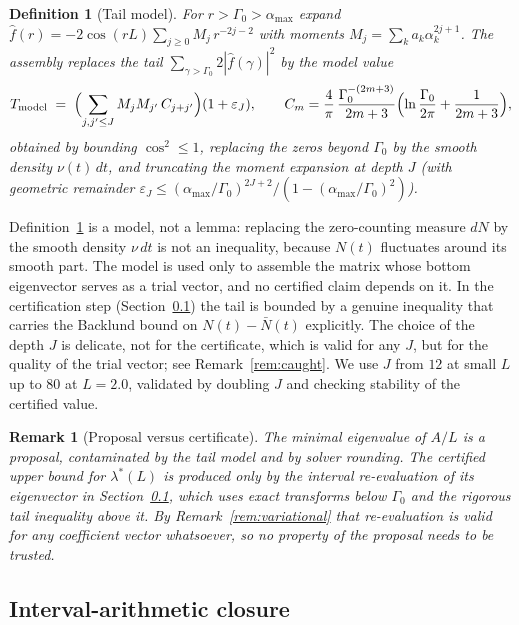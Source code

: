 ﻿\documentclass[11pt]{article}
\newtheorem{remark}[theorem]{Remark}
\newtheorem{definition}[theorem]{Definition}
\newcommand{\lmin}{\lambda^{*}}
\newcommand{\fhat}{\hat f}
\begin{document}
\begin{definition}[Tail model]\label{lem:tail}
For $r>\Gamma_0>\alpha_{\max}$ expand
$\fhat(r)=-2\cos(rL)\sum_{j\ge0}M_j\,r^{-2j-2}$ with moments
$M_j=\sum_k a_k\alpha_k^{2j+1}$.  The assembly replaces the tail
$\sum_{\gamma>\Gamma_0}2|\fhat(\gamma)|^{2}$ by the model value
\[
  T_{\rm model}
  \;=\;
  \Bigl(\sum_{j,j'\le J}M_jM_{j'}\,C_{j+j'}\Bigr)(1+\varepsilon_J),
  \qquad
  C_m=\frac{4}{\pi}\,
  \frac{\Gamma_0^{-(2m+3)}}{2m+3}
  \Bigl(\ln\frac{\Gamma_0}{2\pi}+\frac{1}{2m+3}\Bigr),
\]
obtained by bounding $\cos^2\le1$, replacing the zeros beyond
$\Gamma_0$ by the smooth density $\nu(t)\,dt$, and truncating the
moment expansion at depth $J$ (with geometric remainder
$\varepsilon_J\le(\alpha_{\max}/\Gamma_0)^{2J+2}/(1-(\alpha_{\max}/\Gamma_0)^2)$).
\end{definition}

Definition~\ref{lem:tail} is a model, not a lemma: replacing the
zero-counting measure $dN$ by the smooth density $\nu\,dt$ is not an
inequality, because $N(t)$ fluctuates around its smooth part.  The
model is used only to assemble the matrix whose bottom eigenvector
serves as a trial vector, and no certified claim depends on it.  In the
certification step (Section~\ref{sec:ivclosure}) the tail is bounded
by a genuine inequality that carries the Backlund bound on
$N(t)-\bar N(t)$ explicitly.  The choice of the depth $J$ is delicate,
not for the certificate, which is valid for any $J$, but for the
quality of the trial vector; see Remark~\ref{rem:caught}.  We use $J$
from $12$ at small $L$ up to $80$ at $L=2.0$, validated by doubling
$J$ and checking stability of the certified value.

\begin{remark}[Proposal versus certificate]\label{rem:cert}
The minimal eigenvalue of $A/L$ is a proposal, contaminated by the tail
model and by solver rounding.  The certified upper bound for $\lmin(L)$
is produced only by the interval re-evaluation of its eigenvector in
Section~\ref{sec:ivclosure}, which uses exact transforms below
$\Gamma_0$ and the rigorous tail inequality above it.  By
Remark~\ref{rem:variational} that re-evaluation is valid for any
coefficient vector whatsoever, so no property of the proposal needs to
be trusted.
\end{remark}

\subsection{Interval-arithmetic closure}\label{sec:ivclosure}
\end{document}
